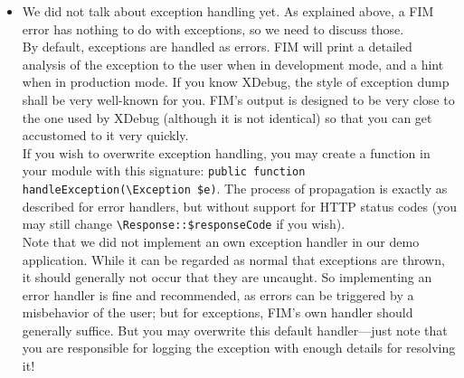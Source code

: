 \documentclass{scrartcl}
\begin{document}
\begin{itemize}
            What does FIM with PHP's errors (assuming there are ones, of course...)? \\ First of all, every error will be logged in the default log file, \texttt{errors.log}. Second, when in production mode, a message will be printed for fatal errors, which informs about the error, but does not reveal any details. When in development mode, any error will be printed to the user as done by PHP's default error handler. \\
            An exception is made for error of type \lstinline!E_RECOVERABLE_ERROR!. Those errors are something crazy. While they are designed particularly for being catched, a \lstinline!try!-\lstinline!catch!-statement will not catch them, but the script will be aborted. This is because \lstinline!catch! only catches exceptions, but no errors. So FIM automatically converts every recoverable error into an exception of type \lstinline!ErrorException! which can then be caught.
         \item
            We did not talk about exception handling yet. As explained above, a FIM error has nothing to do with exceptions, so we need to discuss those. \\
            By default, exceptions are handled as errors. FIM will print a detailed analysis of the exception to the user when in development mode, and a hint when in production mode. If you know XDebug, the style of exception dump shall be very well-known for you. FIM's output is designed to be very close to the one used by XDebug (although it is not identical) so that you can get accustomed to it very quickly. \\
            If you wish to overwrite exception handling, you may create a function in your module with this signature:
            \lstinline!public function handleException(\Exception $e)!. The process of propagation is exactly as described for error handlers, but without support for HTTP status codes (you may still change \lstinline!\Response::$responseCode! if you wish). \\
            Note that we did not implement an own exception handler in our demo application. While it can be regarded as normal that exceptions are thrown, it should generally not occur that they are uncaught. So implementing an error handler is fine and recommended, as errors can be triggered by a misbehavior of the user; but for exceptions, FIM's own handler should generally suffice. But you may overwrite this default handler---just note that you are responsible for logging the exception with enough details for resolving it!
      \end{itemize}
\end{document}
